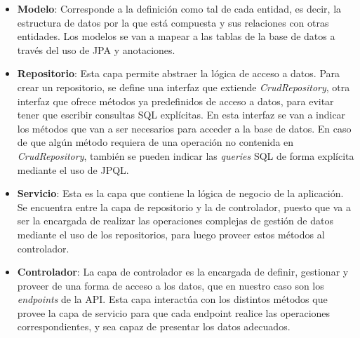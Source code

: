 \begin{itemize}
\item \textbf{Modelo}: Corresponde a la definición como tal de cada entidad, es decir, la estructura de datos por la que está compuesta y sus relaciones con otras entidades. Los modelos se van a mapear a las tablas de la base de datos a través del uso de JPA y anotaciones.
\item \textbf{Repositorio}: Esta capa permite abstraer la lógica de acceso a datos. Para crear un repositorio, se define una interfaz que extiende \textit{CrudRepository}, otra interfaz que ofrece métodos ya predefinidos de acceso a datos, para evitar tener que escribir consultas SQL explícitas. En esta interfaz se van a indicar los métodos que van a ser necesarios para acceder a la base de datos. En caso de que algún método requiera de una operación no contenida en \textit{CrudRepository}, también se pueden indicar las \textit{queries} SQL de forma explícita mediante el uso de JPQL.
\item \textbf{Servicio}: Esta es la capa que contiene la lógica de negocio de la aplicación. Se encuentra entre la capa de repositorio y la de controlador, puesto que va a ser la encargada de realizar las operaciones complejas de gestión de datos mediante el uso de los repositorios, para luego proveer estos métodos al controlador. 
\item \textbf{Controlador}: La capa de controlador es la encargada de definir, gestionar y proveer de una forma de acceso a los datos, que en nuestro caso son los \textit{endpoints} de la API. Esta capa interactúa con los distintos métodos que provee la capa de servicio para que cada endpoint realice las operaciones correspondientes, y sea capaz de presentar los datos adecuados.
\end{itemize}

